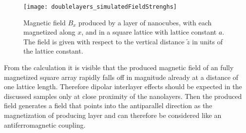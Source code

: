 \documentclass[\main/dresen_thesis.tex]{subfiles}
\begin{document}
  \begin{figure}[tb]
    \centering
    \texttt{[image: doublelayers\_simulatedFieldStrenghs]}
    \caption{\label{fig:doubleLayers:layerMagneticField}Magnetic field $B_x$ produced by a layer of nanocubes, with each magnetized along $x$, and in a square lattice with lattice constant $a$. The field is given with respect to the vertical distance $\tilde{z}$ in units of the lattice constant.}
  \end{figure}                                                    

  From the calculation it is visible that the produced magnetic field of an fully magnetized square array rapidly falls off in magnitude already at a distance of one lattice length.
  Therefore dipolar interlayer effects should be expected in the discussed samples only at close proximity of the nanolayers.
  Then the produced field generates a field that points into the antiparallel direction as the magnetization of producing layer and can therefore be considered like an antiferromagnetic coupling.
\end{document}

